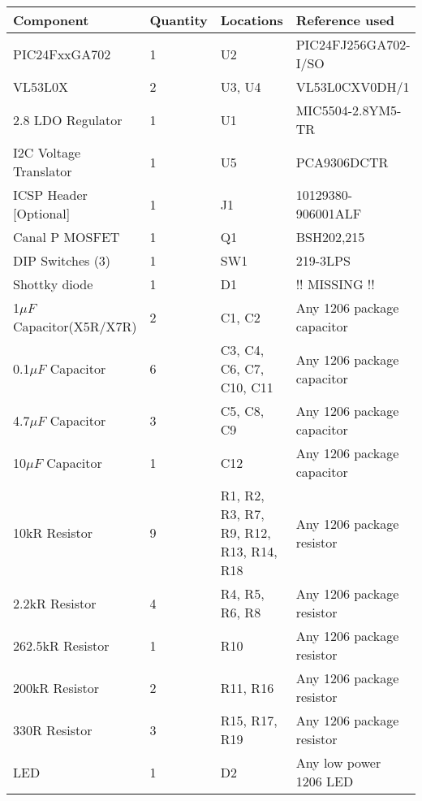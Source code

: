 \begin{tabularx}{\textwidth}{|X|X|X|X|}
\hline 
Component & Quantity & Locations & Reference used \\ 
\hline 
PIC24FxxGA702 & 1 & U2 & PIC24FJ256GA702-I/SO \\ 
\hline 
VL53L0X & 2 & U3, U4 & VL53L0CXV0DH/1 \\ 
\hline 
2.8 LDO Regulator & 1 & U1 & MIC5504-2.8YM5-TR \\ 
\hline 
I2C Voltage Translator & 1 & U5 & PCA9306DCTR \\ 
\hline 
ICSP Header [Optional] & 1 & J1 & 10129380-906001ALF \\ 
\hline 
Canal P MOSFET & 1 & Q1 & BSH202,215 \\ 
\hline 
DIP Switches (3) & 1 & SW1 & 219-3LPS \\ 
\hline 
Shottky diode & 1 & D1 & \color{red} !! MISSING !! \\ 
\hline 
1$\mu F$ Capacitor(X5R/X7R) & 2 & C1, C2 & Any 1206 package capacitor \\ 
\hline 
0.1$\mu F$ Capacitor & 6 & C3, C4, C6, C7, C10, C11 & Any 1206 package capacitor \\ 
\hline 
4.7$\mu F$ Capacitor & 3 & C5, C8, C9 & Any 1206 package capacitor \\ 
\hline 
10$\mu F$ Capacitor & 1 & C12 & Any 1206 package capacitor \\ 
\hline 
10kR Resistor & 9 & R1, R2, R3, R7, R9, R12, R13, R14, R18 & Any 1206 package resistor \\ 
\hline 
2.2kR Resistor & 4 & R4, R5, R6, R8 & Any 1206 package resistor \\ 
\hline 
262.5kR Resistor & 1 & R10 & Any 1206 package resistor \\ 
\hline 
200kR Resistor & 2 & R11, R16 & Any 1206 package resistor \\ 
\hline 
330R Resistor & 3 & R15, R17, R19 & Any 1206 package resistor \\ 
\hline 
LED & 1 & D2 & Any low power 1206 LED \\ 
\hline 
\end{tabularx} 